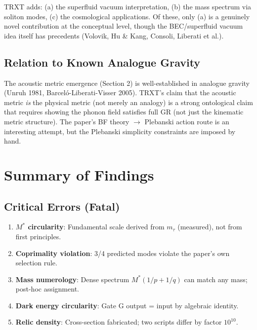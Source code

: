 \documentclass[12pt, a4paper]{article}
\begin{document}
TRXT adds: (a) the superfluid vacuum interpretation, (b) the mass spectrum via soliton modes, (c) the cosmological applications. Of these, only (a) is a genuinely novel contribution at the conceptual level, though the BEC/superfluid vacuum idea itself has precedents (Volovik, Hu \& Kang, Consoli, Liberati et al.).

\subsection{Relation to Known Analogue Gravity}

The acoustic metric emergence (Section 2) is well-established in analogue gravity (Unruh 1981, Barceló-Liberati-Visser 2005). TRXT's claim that the acoustic metric \emph{is} the physical metric (not merely an analogy) is a strong ontological claim that requires showing the phonon field satisfies full GR (not just the kinematic metric structure). The paper's BF theory $\to$ Plebanski action route is an interesting attempt, but the Plebanski simplicity constraints are imposed by hand.

\section{Summary of Findings}

\subsection{Critical Errors (Fatal)}
\begin{enumerate}[label=\textbf{C\arabic*}]
    \item \textbf{$M^*$ circularity}: Fundamental scale derived from $m_\tau$ (measured), not from first principles.
    \item \textbf{Coprimality violation}: 3/4 predicted modes violate the paper's own selection rule.
    \item \textbf{Mass numerology}: Dense spectrum $M^*(1/p + 1/q)$ can match any mass; post-hoc assignment.
    \item \textbf{Dark energy circularity}: Gate G output = input by algebraic identity.
    \item \textbf{Relic density}: Cross-section fabricated; two scripts differ by factor $10^{10}$.
\end{enumerate}
\end{document}
